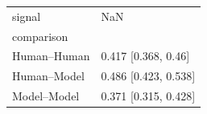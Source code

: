 \begin{tabular}{ll}
\toprule
signal & NaN \\
comparison &  \\
\midrule
Human–Human & 0.417 [0.368, 0.46] \\
Human–Model & 0.486 [0.423, 0.538] \\
Model–Model & 0.371 [0.315, 0.428] \\
\bottomrule
\end{tabular}
